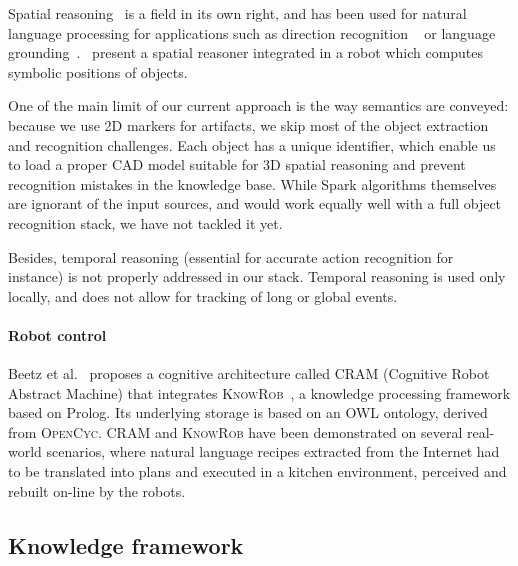\documentclass[preprint,3p,times]{elsarticle}
\begin{document}
Spatial reasoning~\cite{O'Keefe1999} is a field in its own right, and has been
used for natural language processing for applications such as direction
recognition ~\cite{Kollar2010,Matuszek2010} or language
grounding~\cite{Tellex2010}.~\cite{Skubic2004} present a spatial reasoner
integrated in a robot which computes symbolic positions of objects.

One of the main limit of our current approach is the way semantics are
conveyed: because we use 2D markers for artifacts, we skip most of the object
extraction and recognition challenges. Each object has a unique identifier,
which enable us to load a proper CAD model suitable for 3D spatial reasoning
and prevent recognition mistakes in the knowledge base. While {\sc Spark}
algorithms themselves are ignorant of the input sources, and would work equally
well with a full object recognition stack, we have not tackled it yet.

Besides, temporal reasoning (essential for accurate action recognition for
instance) is not properly addressed in our stack. Temporal reasoning is used
only locally, and does not allow for tracking of long or global events.

\paragraph{Robot control}


Beetz et al.~\cite{Beetz2010} proposes a cognitive architecture called
\textsc{CRAM} (Cognitive Robot Abstract Machine) that integrates
\textsc{KnowRob}~\cite{Tenorth2009a}, a knowledge processing framework based on
Prolog. Its underlying storage is based on an OWL ontology, derived from
\textsc{OpenCyc}. \textsc{CRAM} and \textsc{KnowRob} have been demonstrated on
several real-world scenarios, where natural language recipes extracted from the
Internet had to be translated into plans and executed in a kitchen environment,
perceived and rebuilt on-line by the robots.


\subsection{Knowledge framework}
\label{krs-discussion}
\end{document}
